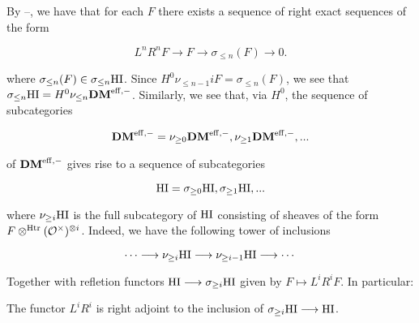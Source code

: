 \newcommand{\olDM}[1]{\sigma_{\leq #1}}
\newcommand{\ogDM}[1]{\sigma_{\geq #1}}
\newcommand{\nlDM}[1]{\nu_{\leq #1}}
\newcommand{\ngDM}[1]{\nu_{\geq #1}}
\newcommand{\ohomeHI}[0]{\underline{Hom}_{\sigma \geq i\HI}}
\newcommand{\torT}[0]{\mathbb{T}}
\newcommand{\torF}[0]{\mathbb{F}}
\newcommand{\xlongrightarrow}[1]{\stackrel{#1}{\longrightarrow}}
\newcommand{\homTorTn}[0]{\mathrm{Hom}_{\torT_n}}

By --, we have that for each $F$ there exists a sequence of right 
exact sequences of the form 

\begin{equation}
L^nR^n F \longrightarrow F \longrightarrow \olDM{n}(F)
\longrightarrow 0.
\end{equation}

where $\olDM{n}(F) \in \olDM{n} \HI$. Since $H^0 \nlDM{n-1} iF = 
\olDM{n}(F)$, we see that $\olDM{n}\HI=H^0\nlDM{n}\DMm$. 
Similarly, we see that, via $H^0$, the sequence of subcategories

\begin{equation}
\DMm=\ngDM{0}\DMm,\ngDM{1}\DMm,... 
\end{equation}

of $\mathbf{DM}^{\mathrm{eff},-}$ gives rise to a sequence of subcategories

\begin{equation}
\HI=\ogDM{0} \HI, \ogDM{1} \HI, ...
\end{equation}

where $\ngDM{i} \HI$ is the full subcategory of $\mathrm{HI}$ consisting 
of sheaves of the form $F \otimes^{\mathrm{Htr}} (\mathcal{O}^{\times})^{\otimes i}$. Indeed, we have 
the following tower of inclusions

\begin{equation}
\cdots \longrightarrow \ngDM{i} \HI \longrightarrow \ngDM{i-1} \HI 
\longrightarrow \cdots
\end{equation}

Together with refletion functors $\HI \longrightarrow \ogDM{i} 
\HI$ given by $F \mapsto L^iR^i F$. In particular:

\begin{prop}\label{functer_prop}
The functor $L^iR^i$ is right adjoint to the inclusion of $\ogDM{i} 
\HI \longrightarrow \HI$.
\end{prop}

